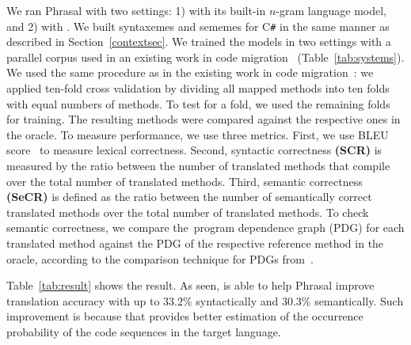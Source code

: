 We ran Phrasal with two settings: 1) with its built-in $n$-gram
language model, and 2) with {\tool}. We built syntaxemes and sememes
for C\texttt{\#} in the same manner as described in
Section~\ref{contextsec}.
%
We trained the models in two settings with a parallel corpus used in
an existing work in code migration~\cite{ase15}
(Table~\ref{tab:systems}). We used the same procedure as in the
existing work in code migration~\cite{ase15}: we applied ten-fold
cross validation by dividing all mapped methods into ten folds with
equal numbers of methods. To test for a fold, we used the remaining
folds for training. The resulting methods were compared against the
respective ones in the oracle.
%
To measure performance, we use three metrics. First, we use BLEU
score~\cite{bleu} to measure lexical correctness. Second, syntactic
correctness {\bf (SCR)} is measured by the ratio between the number of
translated methods that compile over the total number of translated
methods. Third, semantic correctness {\bf (SeCR)} is defined as the
ratio between the number of semantically correct translated methods
over the total number of translated methods. To check semantic
correctness, we compare the~program dependence graph (PDG) for each
translated method against the PDG of the respective reference method
in the oracle, according to the comparison technique for PDGs
from~\cite{hsiao-oopsla14}.

Table~\ref{tab:result} shows the result. As seen, {\tool} is able to
help Phrasal improve translation accuracy with up to 33.2\%
syntactically and 30.3\% semantically. Such improvement is because
that {\tool} provides better estimation of the occurrence probability
of the code sequences in the target language.

